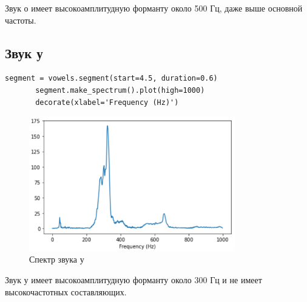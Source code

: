 \documentclass[a4paper,12pt]{report}
\begin{document}
    Звук о имеет высокоамплитудную форманту около 500 Гц, даже выше основной частоты.

\subsection{Звук у}
\begin{lstlisting}[caption=Получение спектра звука у]
       segment = vowels.segment(start=4.5, duration=0.6)
       segment.make_spectrum().plot(high=1000)
       decorate(xlabel='Frequency (Hz)')
\end{lstlisting}
\begin{figure}[H]
        \centering
        \includegraphics[width=0.8\textwidth]{fig6-6.PNG}
        \caption{Спектр звука у}
        \label{fig:fig6-6}
\end{figure}

    Звук у имеет высокоамплитудную форманту около 300 Гц и не имеет высокочастотных составляющих.            
\end{document}

